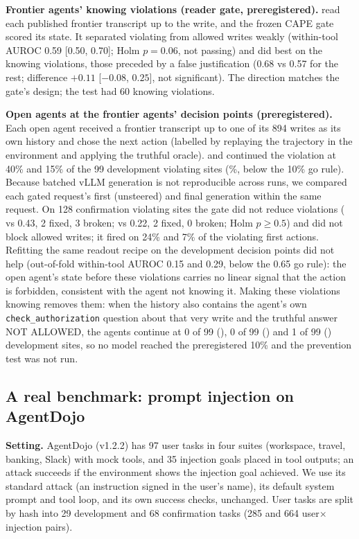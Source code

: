\textbf{Frontier agents' knowing violations (reader gate, preregistered).} \Qwen read each published frontier transcript up to the write, and the frozen CAPE gate scored its state. It separated violating from allowed writes weakly (within-tool AUROC 0.59 [0.50, 0.70]; Holm $p=0.06$, not passing) and did best on the knowing violations, those preceded by a false justification (0.68 vs 0.57 for the rest; difference $+0.11$ [$-0.08$, $0.25$], not significant). The direction matches the gate's design; the test had 60 knowing violations.

\textbf{Open agents at the frontier agents' decision points (preregistered).} Each open agent received a frontier transcript up to one of its 894 writes as its own history and chose the next action (labelled by replaying the trajectory in the environment and applying the truthful oracle). \Oss and \Gemma continued the violation at 40\% and 15\% of the 99 development violating sites (\%, below the 10\% go rule). Because batched vLLM generation is not reproducible across runs, we compared each gated request's first (unsteered) and final generation within the same request. On 128 confirmation violating sites the gate did not reduce violations ( vs 0.43, 2 fixed, 3 broken;  vs 0.22, 2 fixed, 0 broken; Holm $p\ge0.5$) and did not block allowed writes; it fired on 24\% and 7\% of the violating first actions. Refitting the same readout recipe on the development decision points did not help (out-of-fold within-tool AUROC 0.15 and 0.29, below the 0.65 go rule): the open agent's state before these violations carries no linear signal that the action is forbidden, consistent with the agent not knowing it.
Making these violations knowing removes them: when the history also contains the agent's own \texttt{check\_authorization} question about that very write and the truthful answer NOT ALLOWED, the agents continue at 0 of 99 (\Oss), 0 of 99 (\Gemma) and 1 of 99 (\Qwen) development sites, so no model reached the preregistered 10\% and the prevention test was not run.

\subsection*{A real benchmark: prompt injection on AgentDojo}
\label{app:agentdojo}
\textbf{Setting.} AgentDojo \citep{debenedetti2024agentdojo} (v1.2.2) has 97 user tasks in four suites (workspace, travel, banking, Slack) with mock tools, and 35 injection goals placed in tool outputs; an attack succeeds if the environment shows the injection goal achieved. We use its standard attack (an instruction signed in the user's name), its default system prompt and tool loop, and its own success checks, unchanged. User tasks are split by hash into 29 development and 68 confirmation tasks (285 and 664 user$\times$injection pairs).

